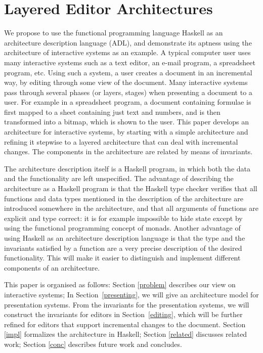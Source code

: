 

\chapter{Layered Editor Architectures}
\label{chap:layeredArchs}


 


 

We propose to use the functional programming language Haskell as an architecture description language (ADL), and demonstrate its aptness using the architecture of interactive systems as an example. A typical computer user uses many interactive systems such as a text editor, an e-mail program, a spreadsheet program, etc. Using such a system, a user creates a document in an incremental way, by editing through some view of the document. Many interactive systems pass through several phases (or layers, stages) when presenting a document to a user. For example in a spreadsheet program, a document containing formulae is first mapped to a sheet containing just text and numbers, and is then transformed into a bitmap, which is shown to the user. This paper develops an architecture for interactive systems, by starting with a simple architecture and refining it stepwise to a layered architecture that can deal with incremental changes. The components in the architecture are related by means of invariants.

The architecture description itself is a Haskell program, in which both the data and the functionality are left unspecified. The advantage of describing the architecture as a Haskell program is that the Haskell type checker verifies that all functions and data types mentioned in the description of the architecture are introduced somewhere in the architecture, and that all arguments of functions are explicit and type correct: it is for example impossible to hide state except by using the functional programming concept of monads. Another advantage of using Haskell as an architecture description language is that the type and the invariants satisfied by a function are a very precise description of the desired functionality. This will make it easier to distinguish and implement different components of an architecture.

This paper is organised as follows: Section \ref{problem} describes our view on interactive systems; In Section~\ref{presenting}, we will give an architecture model for presentation systems. From the invariants for the presentation systems, we will construct the invariants for editors in Section~\ref{editing}, which will be further refined for editors that support incremental changes to the document. Section \ref{impl} formalizes the architecture in Haskell; Section \ref{related} discusses related work; Section \ref{conc} describes future work and concludes.
